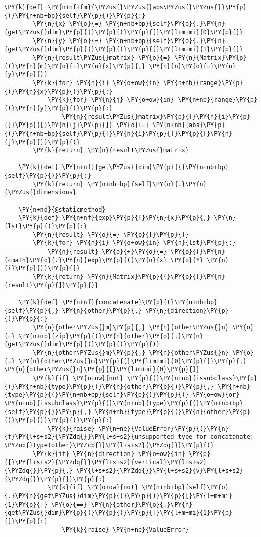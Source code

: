 \begin{Verbatim}[commandchars=\\\{\}]
    \PY{k}{def} \PY{n+nf+fm}{\PYZus{}\PYZus{}abs\PYZus{}\PYZus{}}\PY{p}{(}\PY{n+nb+bp}{self}\PY{p}{)}\PY{p}{:}
        \PY{n}{x} \PY{o}{=} \PY{n+nb+bp}{self}\PY{o}{.}\PY{n}{get\PYZus{}dim}\PY{p}{(}\PY{p}{)}\PY{p}{[}\PY{l+m+mi}{0}\PY{p}{]}
        \PY{n}{y} \PY{o}{=} \PY{n+nb+bp}{self}\PY{o}{.}\PY{n}{get\PYZus{}dim}\PY{p}{(}\PY{p}{)}\PY{p}{[}\PY{l+m+mi}{1}\PY{p}{]}
        \PY{n}{result\PYZus{}matrix} \PY{o}{=} \PY{n}{Matrix}\PY{p}{(}\PY{n}{m}\PY{o}{=}\PY{n}{x}\PY{p}{,} \PY{n}{n}\PY{o}{=}\PY{n}{y}\PY{p}{)}
        \PY{k}{for} \PY{n}{i} \PY{o+ow}{in} \PY{n+nb}{range}\PY{p}{(}\PY{n}{x}\PY{p}{)}\PY{p}{:}
            \PY{k}{for} \PY{n}{j} \PY{o+ow}{in} \PY{n+nb}{range}\PY{p}{(}\PY{n}{y}\PY{p}{)}\PY{p}{:}
                \PY{n}{result\PYZus{}matrix}\PY{p}{[}\PY{n}{i}\PY{p}{]}\PY{p}{[}\PY{n}{j}\PY{p}{]} \PY{o}{=} \PY{n+nb}{abs}\PY{p}{(}\PY{n+nb+bp}{self}\PY{p}{[}\PY{n}{i}\PY{p}{]}\PY{p}{[}\PY{n}{j}\PY{p}{]}\PY{p}{)}
        \PY{k}{return} \PY{n}{result\PYZus{}matrix}

    \PY{k}{def} \PY{n+nf}{get\PYZus{}dim}\PY{p}{(}\PY{n+nb+bp}{self}\PY{p}{)}\PY{p}{:}
        \PY{k}{return} \PY{n+nb+bp}{self}\PY{o}{.}\PY{n}{\PYZus{}dimensions}
    
    \PY{n+nd}{@staticmethod}
    \PY{k}{def} \PY{n+nf}{exp}\PY{p}{(}\PY{n}{x}\PY{p}{,} \PY{n}{lst}\PY{p}{)}\PY{p}{:}
        \PY{n}{result} \PY{o}{=} \PY{p}{[}\PY{p}{]}
        \PY{k}{for} \PY{n}{i} \PY{o+ow}{in} \PY{n}{lst}\PY{p}{:}
            \PY{n}{result} \PY{o}{+}\PY{o}{=} \PY{p}{[}\PY{n}{cmath}\PY{o}{.}\PY{n}{exp}\PY{p}{(}\PY{n}{x} \PY{o}{*} \PY{n}{i}\PY{p}{)}\PY{p}{]}
        \PY{k}{return} \PY{n}{Matrix}\PY{p}{(}\PY{p}{[}\PY{n}{result}\PY{p}{]}\PY{p}{)}
    
    \PY{k}{def} \PY{n+nf}{concatenate}\PY{p}{(}\PY{n+nb+bp}{self}\PY{p}{,} \PY{n}{other}\PY{p}{,} \PY{n}{direction}\PY{p}{)}\PY{p}{:}
        \PY{n}{other\PYZus{}m}\PY{p}{,} \PY{n}{other\PYZus{}n} \PY{o}{=} \PY{n+nb}{zip}\PY{p}{(}\PY{n}{other}\PY{o}{.}\PY{n}{get\PYZus{}dim}\PY{p}{(}\PY{p}{)}\PY{p}{)}
        \PY{n}{other\PYZus{}m}\PY{p}{,} \PY{n}{other\PYZus{}n} \PY{o}{=} \PY{n}{other\PYZus{}m}\PY{p}{[}\PY{l+m+mi}{0}\PY{p}{]}\PY{p}{,} \PY{n}{other\PYZus{}n}\PY{p}{[}\PY{l+m+mi}{0}\PY{p}{]}
        \PY{k}{if} \PY{o+ow}{not} \PY{p}{(}\PY{n+nb}{issubclass}\PY{p}{(}\PY{n+nb}{type}\PY{p}{(}\PY{n}{other}\PY{p}{)}\PY{p}{,} \PY{n+nb}{type}\PY{p}{(}\PY{n+nb+bp}{self}\PY{p}{)}\PY{p}{)} \PY{o+ow}{or} \PY{n+nb}{issubclass}\PY{p}{(}\PY{n+nb}{type}\PY{p}{(}\PY{n+nb+bp}{self}\PY{p}{)}\PY{p}{,} \PY{n+nb}{type}\PY{p}{(}\PY{n}{other}\PY{p}{)}\PY{p}{)}\PY{p}{)}\PY{p}{:}
            \PY{k}{raise} \PY{n+ne}{ValueError}\PY{p}{(}\PY{n}{f}\PY{l+s+s2}{\PYZdq{}}\PY{l+s+s2}{unsupported type for concatanate: \PYZob{}type(other)\PYZcb{}}\PY{l+s+s2}{\PYZdq{}}\PY{p}{)}
        \PY{k}{if} \PY{n}{direction} \PY{o+ow}{in} \PY{p}{[}\PY{l+s+s2}{\PYZdq{}}\PY{l+s+s2}{vertical}\PY{l+s+s2}{\PYZdq{}}\PY{p}{,} \PY{l+s+s2}{\PYZdq{}}\PY{l+s+s2}{v}\PY{l+s+s2}{\PYZdq{}}\PY{p}{]}\PY{p}{:}
            \PY{k}{if} \PY{o+ow}{not} \PY{n+nb+bp}{self}\PY{o}{.}\PY{n}{get\PYZus{}dim}\PY{p}{(}\PY{p}{)}\PY{p}{[}\PY{l+m+mi}{1}\PY{p}{]} \PY{o}{==} \PY{n}{other}\PY{o}{.}\PY{n}{get\PYZus{}dim}\PY{p}{(}\PY{p}{)}\PY{p}{[}\PY{l+m+mi}{1}\PY{p}{]}\PY{p}{:}
                \PY{k}{raise} \PY{n+ne}{ValueError}


\end{Verbatim}
